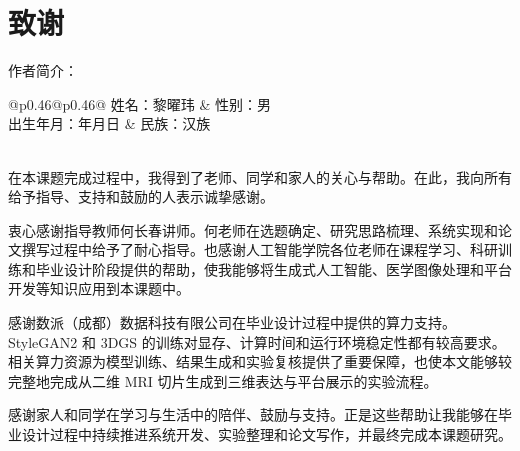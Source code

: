 \chapter*{致\quad 谢}
\thispagestyle{thesis-main}

\thesisbodyfont
\justifying

\noindent 作者简介：

\begingroup
\renewcommand{\arraystretch}{1.4}
\noindent\begin{tabular*}{\textwidth}{@{}p{}@{\extracolsep{\fill}}p{}@{}}
姓名：黎曜玮 & 性别：男 \\
出生年月：{}年{}月{}日 & 民族：汉族 \\
 \\
\end{tabular*}
\endgroup

\vspace{0.5\baselineskip}

在本课题完成过程中，我得到了老师、同学和家人的关心与帮助。在此，我向所有给予指导、支持和鼓励的人表示诚挚感谢。

衷心感谢指导教师何长春讲师。何老师在选题确定、研究思路梳理、系统实现和论文撰写过程中给予了耐心指导。也感谢人工智能学院各位老师在课程学习、科研训练和毕业设计阶段提供的帮助，使我能够将生成式人工智能、医学图像处理和平台开发等知识应用到本课题中。

感谢数派（成都）数据科技有限公司在毕业设计过程中提供的算力支持。StyleGAN2 和 3DGS 的训练对显存、计算时间和运行环境稳定性都有较高要求。相关算力资源为模型训练、结果生成和实验复核提供了重要保障，也使本文能够较完整地完成从二维 MRI 切片生成到三维表达与平台展示的实验流程。

感谢家人和同学在学习与生活中的陪伴、鼓励与支持。正是这些帮助让我能够在毕业设计过程中持续推进系统开发、实验整理和论文写作，并最终完成本课题研究。
